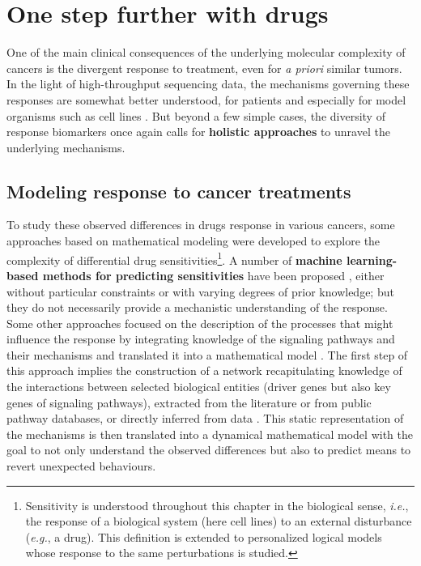 \documentclass[a4paper,12pt,twoside,onecolumn,openright,final,oldfontcommands]{memoir}
\begin{document}
\section{One step further with drugs}\label{one-step-further-with-drugs}

One of the main clinical consequences of the underlying molecular
complexity of cancers is the divergent response to treatment, even for
\emph{a priori} similar tumors. In the light of high-throughput
sequencing data, the mechanisms governing these responses are somewhat
better understood, for patients and especially for model organisms such
as cell lines \citep{heiser2012subtype, garnett2012systematic}. But
beyond a few simple cases, the diversity of response biomarkers once
again calls for \textbf{holistic approaches} to unravel the underlying
mechanisms.

\subsection{Modeling response to cancer
treatments}\label{modeling-response-to-cancer-treatments}

To study these observed differences in drugs response in various
cancers, some approaches based on mathematical modeling were developed
to explore the complexity of differential drug sensitivities\footnote{Sensitivity
  is understood throughout this chapter in the biological sense,
  \emph{i.e.}, the response of a biological system (here cell lines) to
  an external disturbance (\emph{e.g.}, a drug). This definition is
  extended to personalized logical models whose response to the same
  perturbations is studied.}. A number of \textbf{machine learning-based
methods for predicting sensitivities} have been proposed
\citep{costello2014community}, either without particular constraints or
with varying degrees of prior knowledge; but they do not necessarily
provide a mechanistic understanding of the response. Some other
approaches focused on the description of the processes that might
influence the response by integrating knowledge of the signaling
pathways and their mechanisms and translated it into a mathematical
model
\citep{eduati2017drug, jastrzebski2018integrative, frohlich2018efficient}.
The first step of this approach implies the construction of a network
recapitulating knowledge of the interactions between selected biological
entities (driver genes but also key genes of signaling pathways),
extracted from the literature or from public pathway databases, or
directly inferred from data \citep{verny2017learning}. This static
representation of the mechanisms is then translated into a dynamical
mathematical model with the goal to not only understand the observed
differences \citep{jastrzebski2018integrative} but also to predict means
to revert unexpected behaviours.
\end{document}
